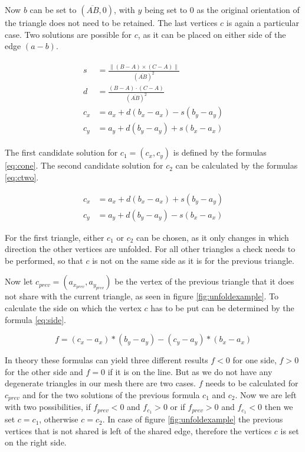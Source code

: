 \documentclass[draft,final]{vutinfth} %
\begin{document}
Now $b$ can be set to $(\overline{AB}, 0)$, with $y$ being set to $0$ as the original orientation of the triangle does not need to be retained. The last vertices $c$ is again a particular case. Two solutions are possible for $c$, as it can be placed on either side of the edge $(a-b)$. 

\begin{align}
\label{eq:cone}
\begin{split}
s &= \frac{\|(B - A)\times(C - A)\|}{(\overline{AB})^2}\\
d &= \frac{(B-A)\cdot(C-A)}{(\overline{AB})^2}\\
c_x &= a_x + d(b_x - a_x) - s(b_y - a_y)\\
c_y &= a_y + d(b_y - a_y) + s(b_x - a_x)
\end{split}
\end{align}

The first candidate solution for $c_1 = (c_x, c_y)$ is defined by the formulas \ref{eq:cone}. The second candidate solution for $c_2$ can be calculated by the formulas \ref{eq:ctwo}. 

\begin{equation}
\label{eq:ctwo}
\begin{split}
c_x &= a_x + d(b_x - a_x) + s(b_y - a_y)\\
c_y &= a_y + d(b_y - a_y) - s(b_x - a_x)
\end{split}
\end{equation}

For the first triangle, either $c_1$ or $c_2$ can be chosen, as it only changes in which direction the other vertices are unfolded. For all other triangles a check needs to be performed, so that $c$ is not on the same side as it is for the previous triangle.

Now let $c_{prev} = (a_{x_{prev}},a_{y_{prev}})$ be the vertex of the previous triangle that it does not share with the current triangle, as seen in figure \ref{fig:unfoldexample}. To calculate the side on which the vertex $c$ has to be put can be determined by the formula \ref{eq:side}.

\begin{equation}
\label{eq:side}
f = (c_x - a_x) * (b_y - a_y) - (c_y - a_y) * (b_x - a_x)
\end{equation}

In theory these formulas can yield three different results $f < 0$ for one side, $f > 0$ for the other side and $f = 0$ if it is on the line. But as we do not have any degenerate triangles in our mesh there are two cases. $f$ needs to be calculated for $c_{prev}$ and for the two solutions of the previous formula $c_1$ and $c_2$. Now we are left with two possibilities, if $f_{prev} < 0$ and $f_{c_1} > 0$ or if $f_{prev} > 0$ and $f_{c_1} < 0$ then we set $c = c_1$, otherwise $c = c_2$. In case of figure \ref{fig:unfoldexample} the previous vertices that is not shared is left of the shared edge, therefore the vertices $c$ is set on the right side.
\end{document}
